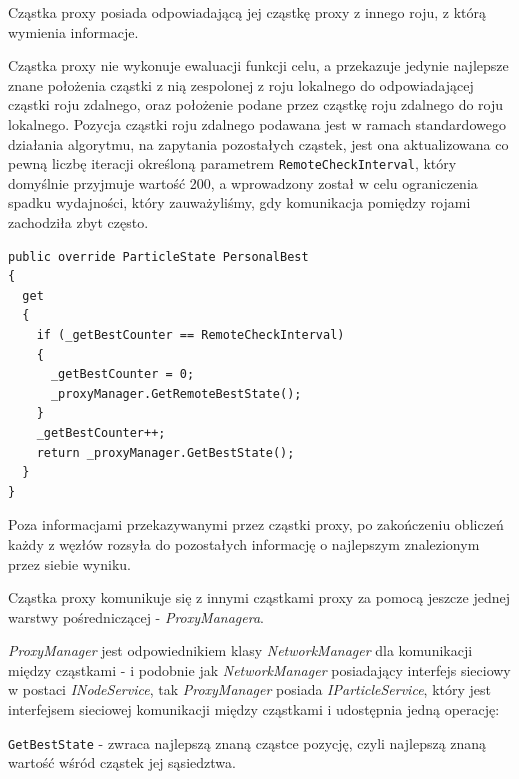 \documentclass[12pt, twoside, openany, abstract=on]{report}
\theoremstyle{definition}
\begin{document}
Cząstka proxy posiada odpowiadającą jej cząstkę proxy z innego roju, z którą wymienia informacje.

Cząstka proxy nie wykonuje ewaluacji funkcji celu, a przekazuje jedynie najlepsze znane położenia cząstki z nią zespolonej z roju lokalnego do odpowiadającej cząstki roju zdalnego, oraz położenie podane przez cząstkę roju zdalnego do roju lokalnego. Pozycja cząstki roju zdalnego podawana jest w ramach standardowego działania algorytmu, na zapytania pozostałych cząstek, jest ona aktualizowana co pewną liczbę iteracji określoną parametrem \texttt{RemoteCheckInterval}, który domyślnie przyjmuje wartość 200, a wprowadzony został w celu ograniczenia spadku wydajności, który zauważyliśmy, gdy komunikacja pomiędzy rojami zachodziła zbyt często.

\lstset{style=sharpc}
\begin{lstlisting}[frame=single]
public override ParticleState PersonalBest
{
  get
  {
    if (_getBestCounter == RemoteCheckInterval)
    {
      _getBestCounter = 0;
      _proxyManager.GetRemoteBestState();
    }
    _getBestCounter++;
    return _proxyManager.GetBestState();
  }
}
\end{lstlisting}


Poza informacjami przekazywanymi przez cząstki proxy, po zakończeniu obliczeń każdy z węzłów rozsyła do pozostałych informację o najlepszym znalezionym przez siebie wyniku.

Cząstka proxy komunikuje się z innymi cząstkami proxy za pomocą jeszcze jednej warstwy pośredniczącej - \textit{ProxyManagera}.

\textit{ProxyManager} jest odpowiednikiem klasy \textit{NetworkManager} dla komunikacji między cząstkami - i podobnie jak \textit{NetworkManager} posiadający interfejs sieciowy w postaci \textit{INodeService}, tak \textit{ProxyManager} posiada \textit{IParticleService}, który jest interfejsem sieciowej komunikacji między cząstkami i udostępnia jedną operację:

\texttt{GetBestState} - zwraca najlepszą znaną cząstce pozycję, czyli najlepszą znaną wartość wśród cząstek jej sąsiedztwa.
\end{document}
